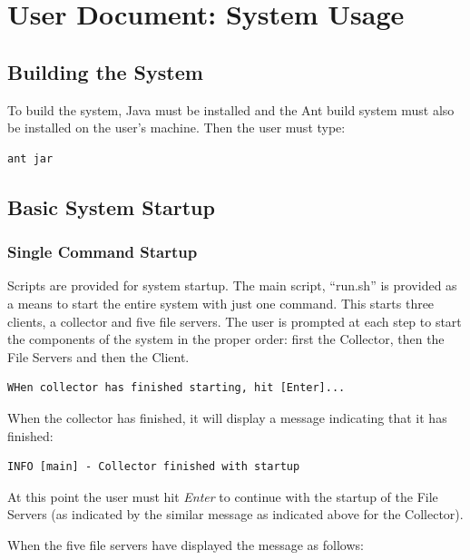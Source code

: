 \documentclass
[english,a4paper]{article}
\begin{document}
\newpage
\section{User Document: System Usage}

\subsection{Building the System}

To build the system, Java must be installed and the Ant build system
must also be installed on the user's machine. Then the user must type:

\begin{verbatim}
ant jar
\end{verbatim}


\subsection{Basic System Startup}

\subsubsection{Single Command Startup}
Scripts are provided for system startup. The main script, ``run.sh''
is provided as a means to start the entire system with just one
command. This starts three clients, a collector and five file
servers. The user is prompted at each step to start the components of
the system in the proper order: first the Collector, then the File
Servers and then the Client. 

\begin{verbatim}
WHen collector has finished starting, hit [Enter]...
\end{verbatim}

When the collector has finished, it will display a message indicating
that it has finished:

\begin{verbatim}
INFO [main] - Collector finished with startup
\end{verbatim}

At this point the user must hit \emph{Enter} to continue with the
startup of the File Servers (as indicated by the similar message as
indicated above for the Collector).

When the five file servers have displayed the message as follows:
\end{document}
